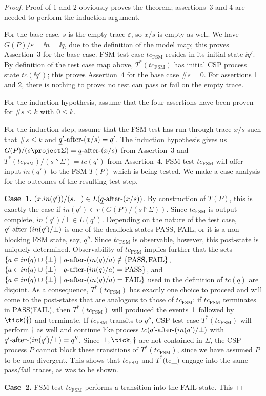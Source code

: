 \begin{proof}
Proof of 1 and 2 obviously proves the theorem; assertions~3 and 4 are 
needed to perform the induction argument.



For the base case, $s$ is the empty trace $\varepsilon$, so $x/s$ is empty as well. We have 
$G(P)/\varepsilon = \ii n = \ii q$, due to the definition of the model map; this proves Assertion~3 for the base case. 
FSM test case $tc_\text{FSM}$ resides in its initial state $\ii q'$. By definition of the test case map above, $T^*(tc_\text{FSM})$ has initial CSP process state $tc(\ii q')$; this proves  Assertion~4 for the base case $\#s = 0$. For assertions 1 and 2, there is nothing to
prove: no test can pass or fail on the empty trace.

For the induction hypothesis, assume that the four assertions have been proven for
$\#s \le k$ with $0\le k$.

For the induction step, assume that the FSM test has run through trace $x/s$ such that
$\#s \le k$ and $\underline{q}'\text{-after-} (x/s) = q'$. The induction hypothesis gives us
$G(P)/(s\project\Sigma) = \ii q\after (x/s)$
from Assertion~3 and
$T^*(tc_\text{FSM})/(s\project \Sigma) = tc(q')$ from Assertion~4.
FSM test $tc_\text{FSM}$ will offer input $in(q')$ to the FSM $T(P)$ which is being tested. We make a case analysis for the outcomes of the resulting test step.

 

\noindent
{\bf Case~1.} $(x.in(q'))/(s.\bot) \in L(\underline{q}\text{-after-} (x/s))$.\newline
By construction of $T(P)$, this is exactly the case if 
$in(q')\in r(G(P)/(s\project \Sigma))$. Since $tc_\text{FSM}$ is output complete,
$in(q')/\bot \in L(q')$. Depending on the nature of the test case, 
$q'\text{-after-} (in(q')/\bot)$ is one of the deadlock states PASS, FAIL, or it is a
non-blocking FSM state, say, $q''$. Since $tc_\text{FSM}$ is observable, however, 
this post-state is uniquely determined. Observability of $tc_\text{FSM}$ 
implies further that the sets $\{ a\in in(q)\cup\{\bot\}~|~q\text{-after-}(in(q)/a)\notin \{\text{PASS},\text{FAIL}\}$, $\{ a\in in(q)\cup\{\bot\}~|~q\text{-after-}(in(q)/a) = \text{PASS} \}$, and $\{ a\in in(q)\cup\{\bot\}~|~q\text{-after-}(in(q)/a) = \text{FAIL} \}$
used in the definition of $tc(q)$ are disjoint. As a consequence, $T^*(tc_\text{FSM})$
has exactly one choice to proceed and will come to the post-states that are analogous to those of $tc_\text{FSM}$: if $tc_\text{FSM}$ terminates in PASS(FAIL), then 
$T^*(tc_\text{FSM})$ will produced the events $\bot$ followed by 
$\tick(\dag)$ and terminate. If $tc_\text{FSM}$  transits to $q''$, CSP test case
$T^*(tc_\text{FSM})$ will perform $\dag$ as well and continue like process 
$tc(q'\text{-after-}(in(q')/\bot)$ with $q'\text{-after-}(in(q')/\bot) = q''$. 
Since $\bot,\tick,\dag$ are not contained in $\Sigma$, the CSP process $P$ 
cannot block these transitions of  $T^*(tc_\text{FSM})$, since we have assumed $P$ to be non-divergent. This shows that $tc_\text{FSM}$ and $T^*($tc_$)$ engage into the same pass/fail traces, as was to be shown.

 

\noindent
{\bf Case~2.} FSM test $tc_\text{FSM}$ 
performs a transition into the FAIL-state. This
\xbox
\end{proof}



